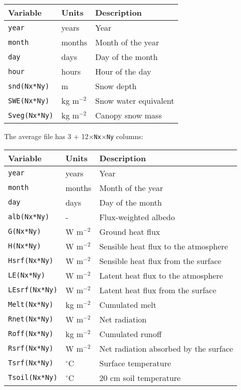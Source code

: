 \documentclass{article}
\begin{document}
\begin{longtable}{|l|l|l|}
\hline
Variable & Units & Description \\
\hline
{\tt year}        & years       & Year                  \\
{\tt month}       & months      & Month of the year     \\
{\tt day}         & days        & Day of the month      \\
{\tt hour}        & hours       & Hour of the day       \\
{\tt snd(Nx*Ny)}  & m           & Snow depth            \\
{\tt SWE(Nx*Ny)}  & kg m$^{-2}$ & Snow water equivalent \\
{\tt Sveg(Nx*Ny)} & kg m$^{-2}$ & Canopy snow mass      \\
\hline 
\end{longtable}

The average file has 3 + 12$\times${\tt Nx$\times$Ny} columns:

\begin{longtable}{|l|l|l|}
\hline
Variable & Units & Description \\
\hline
{\tt year}         & years        & Year                                 \\
{\tt month}        & months       & Month of the year                    \\
{\tt day}          & days         & Day of the month                     \\
{\tt alb(Nx*Ny)}   & -            & Flux-weighted albedo                 \\
{\tt G(Nx*Ny)}     & W m$^{-2}$  & Ground heat flux                     \\
{\tt H(Nx*Ny)}     & W m$^{-2}$  & Sensible heat flux to the atmosphere \\
{\tt Hsrf(Nx*Ny)}  & W m$^{-2}$  & Sensible heat flux from the surface  \\
{\tt LE(Nx*Ny)}    & W m$^{-2}$  & Latent heat flux to the atmosphere   \\
{\tt LEsrf(Nx*Ny)} & W m$^{-2}$  & Latent heat flux from the surface    \\
{\tt Melt(Nx*Ny)}  & kg m$^{-2}$ & Cumulated melt                       \\
{\tt Rnet(Nx*Ny)}  & W m$^{-2}$  & Net radiation                        \\
{\tt Roff(Nx*Ny)}  & kg m$^{-2}$ & Cumulated runoff                     \\
{\tt Rsrf(Nx*Ny)}  & W m$^{-2}$  & Net radiation absorbed by the surface\\
{\tt Tsrf(Nx*Ny)}  & $^\circ$C    & Surface temperature                  \\
{\tt Tsoil(Nx*Ny)} & $^\circ$C    & 20 cm soil temperature               \\
\hline 
\end{longtable}
\end{document}
